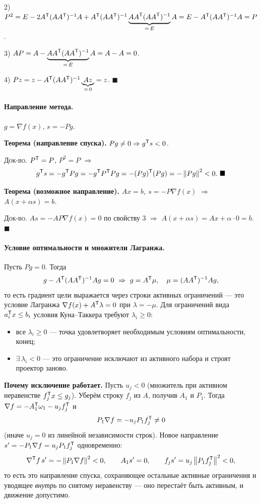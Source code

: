 2) $P^2 = E - 2A^{\mathsf{T}}(AA^{\mathsf{T}})^{-1}A + A^{\mathsf{T}}(AA^{\mathsf{T}})^{-1}\underbrace{AA^{\mathsf{T}}(AA^{\mathsf{T}})^{-1}}_{=\,E}A
   = E - A^{\mathsf{T}}(AA^{\mathsf{T}})^{-1}A = P$.

3) $AP = A - \underbrace{AA^{\mathsf{T}}(AA^{\mathsf{T}})^{-1}}_{=\,E}A = A - A = 0$.

4) $Pz = z - A^{\mathsf{T}}(AA^{\mathsf{T}})^{-1}\underbrace{Az}_{=\,0} = z$. $\blacksquare$

\paragraph{Направление метода.}
$g = \nabla f(x)$, $s = -Pg$.

\textbf{Теорема (направление спуска).} \textit{$Pg \ne 0 \Rightarrow g^{\mathsf{T}} s < 0$.}

\textsc{Док-во.} $P^{\mathsf{T}} = P$, $P^2 = P$ $\Rightarrow$
\[
  g^{\mathsf{T}} s = -g^{\mathsf{T}} P g = -g^{\mathsf{T}} P^{\mathsf{T}} P g = -(Pg)^{\mathsf{T}}(Pg) = -\left\lVert Pg \right\rVert^2 < 0 .
  \ \blacksquare
\]

\textbf{Теорема (возможное направление).} \textit{$Ax = b$, $s = -P\nabla f(x)$
$\Rightarrow$ $A(x + \alpha s) = b$.}

\textsc{Док-во.} $As = -AP\nabla f(x) = 0$ по свойству 3 $\Rightarrow$
$A(x+\alpha s) = Ax + \alpha\cdot 0 = b$. $\blacksquare$

\paragraph{Условие оптимальности и множители Лагранжа.}
Пусть $Pg = 0$. Тогда
\[
  g - A^{\mathsf{T}}(AA^{\mathsf{T}})^{-1}Ag = 0
  \ \Rightarrow\ g = A^{\mathsf{T}}\mu , \quad \mu = (AA^{\mathsf{T}})^{-1}Ag ,
\]
то есть градиент цели выражается через строки активных ограничений — это
условие Лагранжа $\nabla f(x) + A^{\mathsf{T}}\lambda = 0$ при $\lambda = -\mu$. Для
ограничений вида $a_i^{\mathsf{T}} x \le b_i$ условия Куна--Таккера требуют
$\lambda_i \ge 0$:
\begin{itemize}[nosep,left=0pt]
  \item все $\lambda_i \ge 0$ — точка удовлетворяет необходимым условиям
        оптимальности, конец;
  \item $\exists\,\lambda_i < 0$ — это ограничение исключают из активного
        набора и строят проектор заново.
\end{itemize}

\textbf{Почему исключение работает.} Пусть $u_j < 0$ (множитель при активном
неравенстве $f_j^{\mathsf{T}} x \le g_j$). Уберём строку $f_j$ из $A$, получив $A_1$ и
$P_1$. Тогда $\nabla f = -A_1^{\mathsf{T}}\omega_1 - u_j f_j^{\mathsf{T}}$ и
\[
  P_1\nabla f = -u_j P_1 f_j^{\mathsf{T}} \ne 0
\]
(иначе $u_j = 0$ из линейной независимости строк). Новое направление
$s' = -P_1\nabla f = u_j P_1 f_j^{\mathsf{T}}$ одновременно:
\[
  \nabla^{\mathsf{T}} f\,s' = -\left\lVert P_1\nabla f \right\rVert^2 < 0 , \qquad
  A_1 s' = 0 , \qquad
  f_j s' = u_j\left\lVert P_1 f_j^{\mathsf{T}} \right\rVert^2 < 0 ,
\]
то есть это направление спуска, сохраняющее остальные активные ограничения и
уводящее \emph{внутрь} по снятому неравенству — оно перестаёт быть активным, и
движение допустимо.

